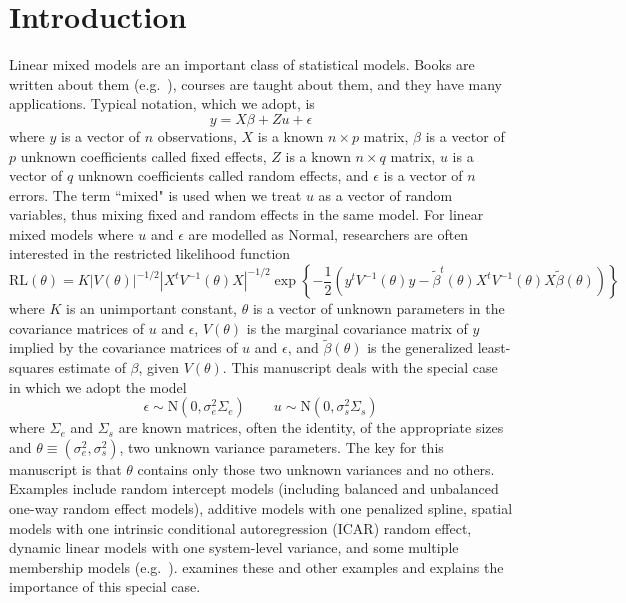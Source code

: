 \documentclass{report}
\newcommand{\N}{\text{N}} %
\newcommand{\RLorig}{\text{RL}}
\begin{document}
\section{Introduction}
\label{sec:intro}
Linear mixed models are an important class of statistical models.  Books are written about them (e.g.\ \citealt{bryk_raudenbush:1992, verbeke&molenberghs:2000, hodges:2013, west&welch&galecki:2014}),  courses are taught about them, and they have many applications.  Typical notation, which we adopt, is
\begin{equation}
\label{eq:lmm}
	y = X\beta + Zu + \epsilon
\end{equation}
where $y$ is a vector of $n$ observations, $X$ is a known $n \times p$ matrix, $\beta$ is a vector of $p$ unknown coefficients called fixed effects, $Z$ is a known $n \times q$ matrix, $u$ is a vector of $q$ unknown coefficients called random effects, and $\epsilon$ is a vector of $n$ errors. The term ``mixed" is used when we treat $u$ as a vector of random variables, thus mixing fixed and random effects in the same model.  For linear mixed models where $u$ and $\epsilon$ are modelled as Normal, researchers are often interested in the restricted likelihood function
\begin{equation}
\label{eq:rll}
  \RLorig(\theta) = K |V(\theta)|^{-1/2}|X^tV^{-1}(\theta)X|^{-1/2}
                       \exp\left\{ -\frac{1}{2} \left(y^tV^{-1}(\theta)y -
                                                                \tilde\beta^t(\theta)X^tV^{-1}(\theta)X\tilde\beta(\theta)
                                                         \right)
                              \right\}
\end{equation}
where $K$ is an unimportant constant, $\theta$ is a vector of unknown parameters in the covariance matrices of $u$ and $\epsilon$, $V(\theta)$ is the marginal covariance matrix of $y$ implied by the covariance matrices of $u$ and $\epsilon$, and $\tilde\beta(\theta)$ is the generalized least-squares estimate of $\beta$, given $V(\theta)$.
This manuscript deals with the special case in which we adopt the model
\begin{equation*}
	\epsilon \sim \N (0, \sigma_e^2 \Sigma_e) \qquad u \sim \N (0, \sigma_s^2 \Sigma_s)
\end{equation*}
where $\Sigma_e$ and $\Sigma_s$ are known matrices, often the identity, of the appropriate sizes and $\theta \equiv (\sigma_e^2, \sigma_s^2)$, two unknown variance parameters.  The key for this manuscript is that $\theta$ contains only those two unknown variances and no others.  Examples include random intercept models (including balanced and unbalanced one-way random effect models), additive models with one penalized spline, spatial models with one intrinsic conditional autoregression (ICAR) random effect, dynamic linear models with one system-level variance, and some multiple membership models (e.g.\ \citealt{browne_etal:2001, mccaffrey_etal:2004}).  \cite{hodges:2013} examines these and other examples and explains the importance of this special case.
\end{document}
